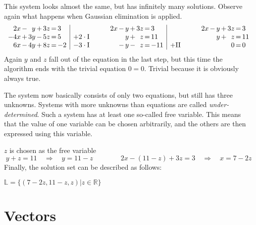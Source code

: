 \documentclass[12pt,eng]{skript_ogg}
\begin{document}
This system looks almost the same, but has infinitely many solutions. Observe again what happens when Gaussian elimination is applied.
\[\begin{array}{r@{\,}c@{\,}r@{\,}c@{\,}r@{\,}c@{\,}l|l}
2x & - & y & + & 3z & = & 3 &\\
-4x & + & 3y & - & 5z & = & 5 & +2\cdot\mbox{I}\\
6x & - & 4y & + & 8z & = & -2 & -3\cdot\mbox{I}
\end{array}\qquad\begin{array}{r@{\,}c@{\,}r@{\,}c@{\,}r@{\,}c@{\,}l|l}
2x & - & y & + & 3z & = & 3 &\\
 & & y & + & z & = & 11 &\\
 & - & y & - & z & = & -11 &+\mbox{II}
\end{array}\qquad\begin{array}{r@{\,}c@{\,}r@{\,}c@{\,}r@{\,}c@{\,}l}
2x & - & y & + & 3z & = & 3 \\
 &  & y & + & z & = & 11 \\
 & & & & 0 & = & 0
\end{array}\]
Again $y$ and $z$ fall out of the equation in the last step, but this time the algorithm ends with the trivial equation $0=0$. Trivial because it is obviously always true.

The system now basically consists of only two equations, but still has three unknowns. Systems with more unknowns than equations are called \emph{under-determined}. Such a system has at least one so-called free variable. This means that the value of one variable can be chosen arbitrarily, and the others are then expressed using this variable.

$z$ is chosen as the free variable
\[y+z=11\quad\Rightarrow\quad y=11-z\qquad\qquad2x-(11-z)+3z=3\quad\Rightarrow\quad x=7-2z\]
Finally, the solution set can be described as follows:

$\mathbb{L}=\{(7-2z,11-z,z)|z\in\mathbb{R}\}$

\section{Vectors}
\end{document}
